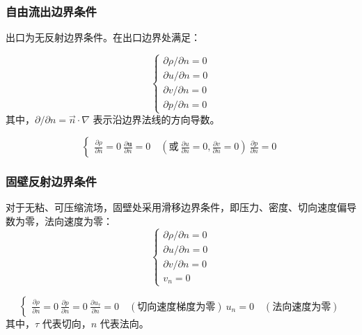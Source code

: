 \documentclass{article}
\numberwithin{equation}{section}    %
\begin{document}
\subsubsection{自由流出边界条件}
出口为无反射边界条件。在出口边界处满足：

\begin{equation}
    \begin{cases} 
        \partial \rho / \partial n = 0 \\ 
        \partial u / \partial n = 0 \\ 
        \partial v / \partial n = 0 \\ 
        \partial p / \partial n = 0 
        \end{cases}
\end{equation}
其中，\(\partial / \partial n = \vec{n} \cdot \nabla\) 表示沿边界法线的方向导数。


\begin{equation}
    \begin{cases}
    \frac{\partial \rho}{\partial n} = 0 \
    \frac{\partial \mathbf{u}}{\partial n} = 0 \quad (\text{或} \ \frac{\partial u}{\partial n} = 0, \frac{\partial v}{\partial n} = 0) \
    \frac{\partial p}{\partial n} = 0
    \end{cases}
    \end{equation}
\subsubsection{固壁反射边界条件}
对于无粘、可压缩流场，固壁处采用滑移边界条件，即压力、密度、切向速度偏导数为零，法向速度为零：
\begin{equation}
    \begin{cases} 
        \partial \rho / \partial n = 0 \\ 
        \partial u / \partial n = 0 \\ 
        \partial v / \partial n = 0 \\ 
        v_n = 0 
        \end{cases}
\end{equation}


\begin{equation}
    \begin{cases}
    \frac{\partial \rho}{\partial n} = 0 \
    \frac{\partial p}{\partial n} = 0 \
    \frac{\partial u_\tau}{\partial n} = 0 \quad (\text{切向速度梯度为零}) \
    u_n = 0 \quad (\text{法向速度为零})
    \end{cases}
    \end{equation}
其中，\(\tau\) 代表切向，\(n\) 代表法向。
\end{document}
